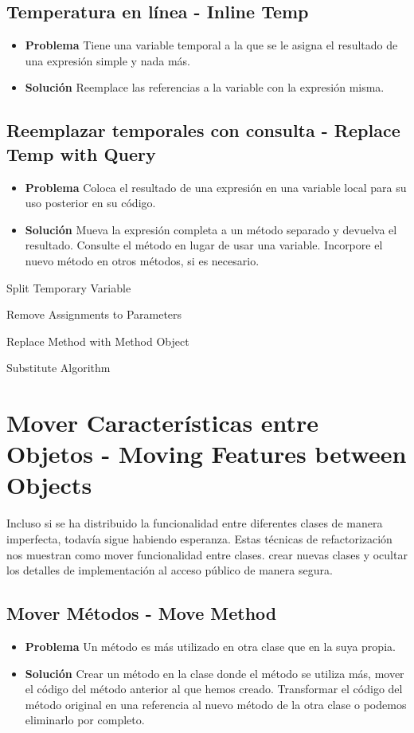 \documentclass[11pt,a4paper,oneside]{book}
\begin{document}
\subsection{Temperatura en línea - Inline Temp}
\label{inlinetemp}
\begin{itemize}
    \item \textbf{Problema} Tiene una variable temporal a la que se le asigna el resultado de una expresión simple y nada más.
    \item \textbf{Solución} Reemplace las referencias a la variable con la expresión misma.
\end{itemize}
    
\subsection{Reemplazar temporales con consulta - Replace Temp with Query}
\label{replacetempwithquery}
\begin{itemize}
    \item \textbf{Problema} Coloca el resultado de una expresión en una variable local para su uso posterior en su código.
    \item \textbf{Solución} Mueva la expresión completa a un método separado y devuelva el resultado. Consulte el método en lugar de usar una variable. Incorpore el nuevo método en otros métodos, si es necesario.
\end{itemize}
    
    Split Temporary Variable
    
    Remove Assignments to Parameters
    
    Replace Method with Method Object
    
    Substitute Algorithm


\section{Mover Características entre Objetos - Moving Features between Objects}

\label{renombrarmetodo} Incluso si se ha distribuido la funcionalidad entre diferentes clases de manera imperfecta, todavía sigue habiendo esperanza.
Estas técnicas de refactorización nos muestran como mover funcionalidad entre clases. crear nuevas clases y ocultar los detalles de implementación al acceso público de manera segura.


\subsection{Mover Métodos - Move Method}  
\begin{itemize}
    \item \textbf{Problema} Un método es más utilizado en otra clase que en la suya propia.
    \item \textbf{Solución} Crear un método en la clase donde el método se utiliza más, mover el código del método anterior al que hemos creado. Transformar el código del método original en una referencia al nuevo método de la otra clase o podemos eliminarlo por completo.
\end{itemize}
    
\end{document}
